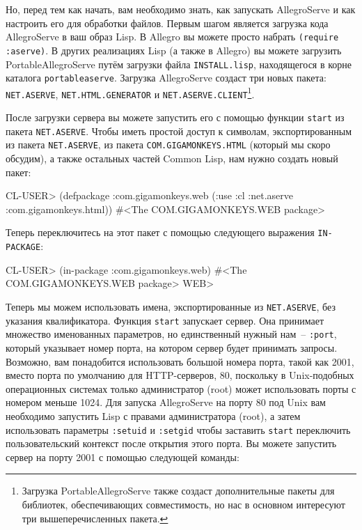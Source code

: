 Но, перед тем как начать, вам необходимо знать, как запускать AllegroServe и как настроить
его для обработки файлов. Первым шагом является загрузка кода AllegroServe в ваш образ
Lisp. В Allegro вы можете просто набрать \lstinline{(require :aserve)}. В других реализациях
Lisp (а также в Allegro) вы можете загрузить PortableAllegroServe путём загрузки файла
\lstinline{INSTALL.lisp}, находящегося в корне каталога \lstinline{portableaserve}. Загрузка
AllegroServe создаст три новых пакета: \lstinline{NET.ASERVE}, \lstinline{NET.HTML.GENERATOR} и
\lstinline{NET.ASERVE.CLIENT}\footnote{Загрузка PortableAllegroServe также создаст
  дополнительные пакеты для библиотек, обеспечивающих совместимость, но нас в основном
  интересуют три вышеперечисленных пакета.}.

После загрузки сервера вы можете запустить его с помощью функции \lstinline{start} из пакета
\lstinline{NET.ASERVE}. Чтобы иметь простой доступ к символам, экспортированным из пакета
\lstinline{NET.ASERVE}, из пакета \lstinline{COM.GIGAMONKEYS.HTML} (который мы скоро обсудим), а
также остальных частей Common Lisp, нам нужно создать новый пакет:

\begin{myverb}
  CL-USER> (defpackage :com.gigamonkeys.web
              (:use :cl :net.aserve :com.gigamonkeys.html))
  #<The COM.GIGAMONKEYS.WEB package>
\end{myverb}

Теперь переключитесь на этот пакет с помощью следующего выражения \lstinline{IN-PACKAGE}:

\begin{myverb}
  CL-USER> (in-package :com.gigamonkeys.web)
  #<The COM.GIGAMONKEYS.WEB package>
WEB>
\end{myverb} 

Теперь мы можем использовать имена, экспортированные из \lstinline{NET.ASERVE}, без указания
квалификатора. Функция \lstinline{start} запускает сервер. Она принимает множество именованных
параметров, но единственный нужный нам~-- \lstinline{:port}, который указывает номер порта, на
котором сервер будет принимать запросы.  Возможно, вам понадобится использовать большой
номера порта, такой как 2001, вместо порта по умолчанию для HTTP-серверов, 80, поскольку в
Unix-подобных операционных системах только администратор (root) может использовать порты с
номером меньше 1024. Для запуска AllegroServe на порту 80 под Unix вам необходимо
запустить Lisp с правами администратора (root), а затем использовать параметры
\lstinline{:setuid} и \lstinline{:setgid} чтобы заставить \lstinline{start} переключить пользовательский
контекст после открытия этого порта. Вы можете запустить сервер на порту 2001 с помощью
следующей команды:

